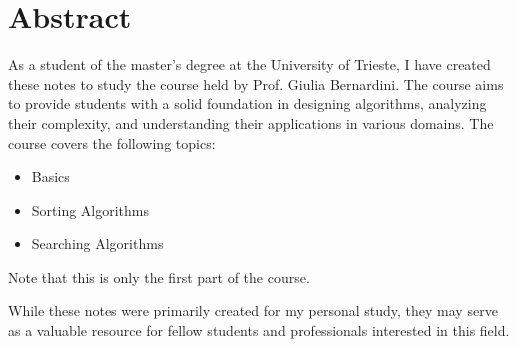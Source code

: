 
\chapter*{Abstract}

As a student of the  master's degree at the University of Trieste, I have created these notes to study the course  held by Prof. Giulia Bernardini. The course aims to provide students with a solid foundation in designing algorithms, analyzing their complexity, and understanding their applications in various domains.
The course covers the following topics:
\begin{itemize}
    \item Basics
    \item Sorting Algorithms
    \item Searching Algorithms
\end{itemize}
Note that this is only the first part of the course.

While these notes were primarily created for my personal study, they may serve as a valuable resource for fellow students and professionals interested in this field.
